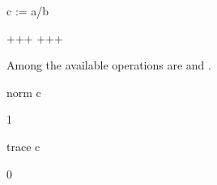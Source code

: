 {{{{{{{{{{{{{{{{{\begin{xtc}
\begin{spadsrc}
c := a/b 
\end{spadsrc}
\begin{TeXOutput}
\begin{fricasmath}{5}
+++%
+++%
%
\end{fricasmath}
\end{TeXOutput}
\end{xtc}
%
\begin{xtc}
\begin{xtccomment}
Among the available operations are  and .
\end{xtccomment}
\begin{spadsrc}
norm c 
\end{spadsrc}
\begin{TeXOutput}
\begin{fricasmath}{6}
1%
\end{fricasmath}
\end{TeXOutput}
\end{xtc}
\begin{xtc}
\begin{xtccomment}
\end{xtccomment}
\begin{spadsrc}
trace c 
\end{spadsrc}
\begin{TeXOutput}
\begin{fricasmath}{7}
0%
\end{fricasmath}
\end{TeXOutput}
\end{xtc}
%
%

}}}}}}}}}}}}}}}}}
